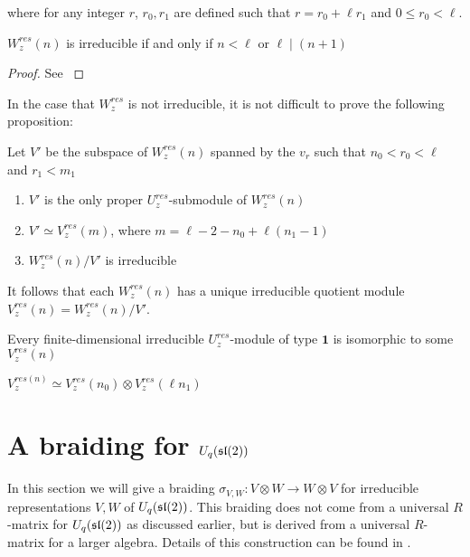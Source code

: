 where for any integer $r$, $r_0,r_1$ are defined such that $r = r_0 + \ell r_1$
and $0 \leq r_0 < \ell$. 

\begin{claim} $W_z^{res}(n)$ is irreducible if and only if $n < \ell$ or $\ell \mid (n+1)$
\end{claim}
\begin{proof}
See \cite{CP}
\end{proof}

In the case that $W_z^{res}$ is not irreducible, it is not difficult to prove the following proposition:

\begin{prop}
Let $V'$ be the subspace of $W_z^{res}(n)$ spanned by the $v_r$ such that $n_0 < r_0 < \ell$ and $r_1 < m_1$
\begin{enumerate}
    \renewcommand{\labelenumi}{\roman{enumi})}
    \item $V'$ is the only proper $U_z^{res}$-submodule of $W_z^{res}(n)$
    \item $V' \simeq V_z^{res}(m)$, where $m = \ell - 2 - n_0 + \ell(n_1 - 1)$
    \item $W_z^{res}(n) / V'$ is irreducible
\end{enumerate}
\end{prop}

It follows that each $W_z^{res}(n)$ has a unique irreducible quotient module $V_z^{res}(n) = W_z^{res}(n) / V'$. 

\begin{theorem}
Every finite-dimensional irreducible $U_z^{res}$-module of type $\mathbf{1}$ is isomorphic to some $V_z^{res}(n)$
\end{theorem}

\begin{theorem}
$V_z^{res(n)} \simeq V_z^{res}(n_0) \otimes V_{z}^{res}(\ell n_1)$
\end{theorem}

\section{A braiding for $U_q(\mathfrak{sl}(2))$}


In this section we will give a braiding $\sigma_{V,W}: V \otimes W \to W
\otimes V$ for irreducible representations $V,W$ of $U_q(\mathfrak{sl}(2))$. This
braiding does not come from a universal $R$-matrix for $U_q(\mathfrak{sl}(2))$ as
discussed earlier, but is derived from a universal $R$-matrix for a larger
algebra. Details of this construction can be found in \cite{CP}.

